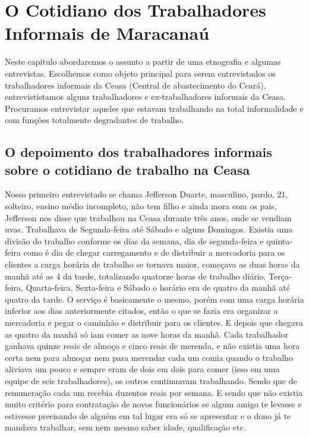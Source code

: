 \chapter{O Cotidiano dos Trabalhadores Informais de Maracanaú}

 Neste capitulo abordaremos o assunto a partir de uma etnografia e algumas entrevistas. Escolhemos 
 como objeto principal para serem entrevistados os trabalhadores informais da Ceasa (Central de 
 abastecimento do Ceará), entrevististamos alguns trabalhadores e ex-trabalhadores informais da 
 Ceasa. Procuramos entrevistar aqueles que estavam trabalhando na total informalidade e com funções
 totalmente degradantes de trabalho.
 
 \section{O depoimento dos trabalhadores informais sobre o cotidiano de trabalho na Ceasa}
 
 Nosso primeiro entrevistado se chama Jefferson Duarte, masculino, pardo, 21, solteiro, ensino médio 
 incompleto, não tem filho e ainda mora com os pais, Jefferson nos disse que trabalhou na Ceasa 
 durante três anos, onde se vendiam uvas. Trabalhava de Segunda-feira até Sábado e alguns Domingos.
 Existia uma divisão do trabalho conforme os dias da semana, dia de segunda-feira e quinta-feira 
 como é dia de chegar carregamento e de distribuir a mercadoria para os clientes a carga horária de 
 trabalho se tornava maior, começava as duas horas da manhã até as 4 da tarde, totalizando quatorze
 horas de trabalho diário. Terça-feira, Quarta-feira, Sexta-feira e Sábado o horário era de quatro
 da manhã até quatro da tarde. O serviço é basicamente o mesmo, porém com uma carga horária inferior
 aos dias anteriormente citados, então o que se fazia era organizar a mercadoria e pegar o caminhão
 e distribuir para os clientes. E depois que chegava as quatro da manhã só iam comer as nove horas
 da manhã. Cada trabalhador ganhava quinze reais de almoço e cinco reais de merenda, e não existia 
 uma hora certa nem para almoçar nem para merendar cada um comia quando o trabalho aliviava um pouco 
 e sempre eram de dois em dois para comer (isso em uma equipe de seis trabalhadores), os outros 
 continuavam trabalhando. Sendo que de remuneração cada um recebia duzentos reais por semana. E 
 sendo que não existia muito critério para contratação de novos funcionários se algum amigo te 
 levasse e estivesse precisando de alguém em tal lugar era só se apresentar e o dono já te mandava 
 trabalhar, sem nem mesmo saber idade, qualificação etc.


